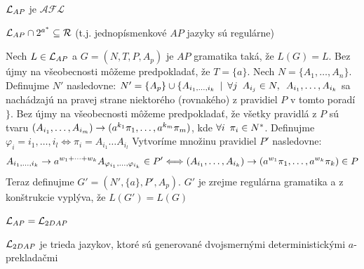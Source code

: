 \begin{veta}
  $\mathcal{L}_{AP}$ je $\mathcal{AFL}$
\end{veta}

\begin{veta}
  $\mathcal{L}_{AP}\cap 2^{a^{*}}\subseteq\mathcal{R}$ (t.j.
  jednopísmenkové $AP$ jazyky sú regulárne)
\end{veta}

\begin{dokaz}
  Nech $L \in \mathcal{L}_{AP}$ a $G=(N,T,P,A_p)$ je $AP$ gramatika
  taká, že $L(G)=L$. Bez újmy na všeobecnosti môžeme predpokladať,
  že $T=\{a\}$. Nech \mbox{$N=\{A_1,\dots,A_n\}$}. Definujme $N'$
  nasledovne: $N'=\{A_p\}\cup\{A_{i_1,\dots,i_k}\enspace |\enspace\forall j\enspace
  A_{i_j}\in N,\enspace A_{i_1},\dots,A_{i_k}$ sa nachádzajú na pravej
  strane niektorého (rovnakého) z pravidiel $P$ v tomto poradí$\}$.
  Bez újmy na všeobecnosti môžeme pred\-pokla\-dať, že všetky
  pravidlá z $P$ sú tvaru
  $(A_{i_1},\dots,A_{i_m})\rightarrow(a^{k_1}\pi_1,\dots,a^{k_m}\pi_m)$, kde
  $\forall i\enspace \pi_i\in N^*$. Definujme
  $\varphi_i=i_1,\dots,i_l\Longleftrightarrow\pi_i=A_{i_1}\dots
  A_{i_l}$ Vytvoríme množinu pravidiel $P'$ nasledovne:
  \[
  A_{i_1,\dots,i_k}\rightarrow
  a^{w_1+\cdots+w_k}A_{\varphi_{i_1},\dots,\varphi_{i_k}}\in
  P'\Longleftrightarrow
  (A_{i_1},\dots,A_{i_k})\rightarrow(a^{w_1}\pi_1,\dots,a^{w_k}\pi_k)\in P
  \]
  Teraz definujme $G'=(N',\{a\},P',A_p)$. $G'$ je zrejme regulárna
  gramatika a z konštrukcie vyplýva, že $L(G')=L(G)$
\end{dokaz}

\begin{veta}
  $\mathcal{L}_{AP}=\mathcal{L}_{2DAP}$
\end{veta}

\begin{poznamka}
  $\mathcal{L}_{2DAP}$ je trieda jazykov, ktoré sú generované
  dvojsmernými determi\-nis\-tic\-ký\-mi $a$-prek\-la\-dač\-mi
\end{poznamka}
